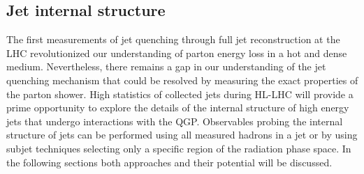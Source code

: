 \subsection{Jet internal structure}\label{sec:jetsub}
The first measurements of jet quenching through full jet reconstruction at the LHC revolutionized our understanding of parton energy loss in a hot and dense medium. Nevertheless, there remains a gap in our understanding of the jet quenching mechanism that could be resolved by measuring the exact properties of the parton shower. High statistics of collected jets during HL-LHC will provide a prime opportunity to explore the details of the internal structure of high energy jets that undergo interactions with the QGP. Observables probing the internal structure of jets can be performed using all measured hadrons in a jet or by using subjet techniques selecting only a specific region of the radiation phase space. In the following sections both approaches and their potential will be discussed.

